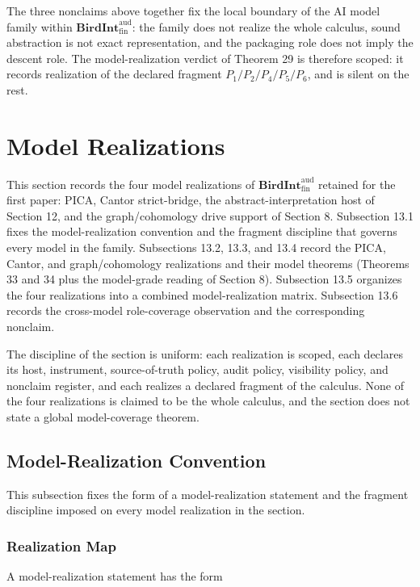 \documentclass[11pt]{article}
\theoremstyle{definition}
\begin{document}
The three nonclaims above together fix the local boundary of the AI model family within \(\mathbf{BirdInt}^{\mathrm{aud}}_{\mathrm{fin}}\): the family does not realize the whole calculus, sound abstraction is not exact representation, and the packaging role does not imply the descent role. The model-realization verdict of Theorem 29 is therefore scoped: it records realization of the declared fragment \(P_1/P_2/P_4/P_5/P_6\), and is silent on the rest.
 \section{Model Realizations}

This section records the four model realizations of \(\mathbf{BirdInt}^{\mathrm{aud}}_{\mathrm{fin}}\) retained for the first paper: PICA, Cantor strict-bridge, the abstract-interpretation host of Section 12, and the graph/cohomology drive support of Section 8. Subsection 13.1 fixes the model-realization convention and the fragment discipline that governs every model in the family. Subsections 13.2, 13.3, and 13.4 record the PICA, Cantor, and graph/cohomology realizations and their model theorems (Theorems 33 and 34 plus the model-grade reading of Section 8). Subsection 13.5 organizes the four realizations into a combined model-realization matrix. Subsection 13.6 records the cross-model role-coverage observation and the corresponding nonclaim.

The discipline of the section is uniform: each realization is scoped, each declares its host, instrument, source-of-truth policy, audit policy, visibility policy, and nonclaim register, and each realizes a declared fragment of the calculus. None of the four realizations is claimed to be the whole calculus, and the section does not state a global model-coverage theorem.

\subsection{Model-Realization Convention}

This subsection fixes the form of a model-realization statement and the fragment discipline imposed on every model realization in the section.

\subsubsection{Realization Map}

A model-realization statement has the form
\end{document}
